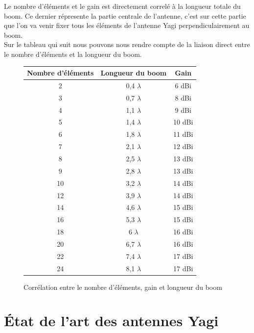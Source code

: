 \documentclass[12pt, a4paper]{article}
\begin{document}
\newpage
Le nombre d'éléments et le gain est directement correlé 
à la longueur totale du boom. Ce dernier répresente la partie
centrale de l'antenne, c'est sur cette partie que l'on va venir
fixer tous les éléments de l'antenne Yagi perpendiculairement au boom.\\

Sur le tableau qui suit nous pouvons nous rendre compte
de la liaison direct entre le nombre d'éléments et la longueur
du boom.\\

\begin{figure}[h]
    \centering
    \begin{tabular}{|c|c|c|}
        \hline
        Nombre d'éléments & Longueur du boom & Gain \\
        \hline
        2 & 0,4 $\lambda$ & 6 dBi \\
        \hline
        3 & 0,7 $\lambda$ & 8 dBi \\
        \hline
        4 & 1,1 $\lambda$ & 9 dBi \\
        \hline
        5 & 1,4 $\lambda$ & 10 dBi \\
        \hline
        6 & 1,8 $\lambda$ & 11 dBi \\
        \hline
        7 & 2,1 $\lambda$ & 12 dBi \\
        \hline
        8 & 2,5 $\lambda$ & 13 dBi \\
        \hline
        9 & 2,8 $\lambda$ & 13 dBi \\
        \hline
        10 & 3,2 $\lambda$ & 14 dBi \\
        \hline
        12 & 3,9 $\lambda$ & 14 dBi \\
        \hline
        14 & 4,6 $\lambda$ & 15 dBi \\
        \hline
        16 & 5,3 $\lambda$ & 15 dBi \\
        \hline
        18 & 6 $\lambda$ & 16 dBi \\
        \hline
        20 & 6,7 $\lambda$ & 16 dBi \\
        \hline
        22 & 7,4 $\lambda$ & 17 dBi \\
        \hline
        24 & 8,1 $\lambda$ & 17 dBi \\
        \hline
    \end{tabular}
    \caption{Corrélation entre le nombre d'éléments, gain et longueur du boom \cite{r2}}
    \label{fig:tableau}
\end{figure}


\newpage
\section{État de l'art des antennes Yagi}
\end{document}
